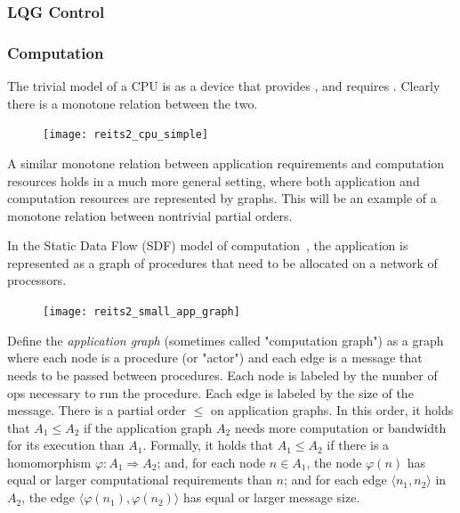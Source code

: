 \begin{figure}[h]
\caption{}
\end{figure}
 

\subsubsection{LQG Control}




\subsubsection{Computation}
 

The trivial model of a CPU is as a device that provides , and requires . Clearly there
is a monotone relation between the two.
\begin{figure}[h]
    \begin{center}
    \texttt{[image: reits2\_cpu\_simple]}
    \caption{}
    \end{center}
    \end{figure}
    
    
A similar monotone relation between application requirements and computation
resources holds in a much more general setting, where both application
and computation resources are represented by graphs. This will be
an example of a monotone relation between nontrivial partial orders.

In the Static Data Flow (SDF) model of computation~\cite[Chapter 3]{sriram00,lee10},
the application is represented as a graph of procedures that need
to be allocated on a network of processors.

\begin{figure}
\texttt{[image: reits2\_small\_app\_graph]}
\end{figure}

Define the\emph{ application graph }(sometimes called "computation
graph") as a graph where each node is a procedure (or "actor")
and each edge is a message that needs to be passed between procedures.
Each node is labeled by the number of ops necessary to run the procedure.
Each edge is labeled by the size of the message. There is a partial
order $ \leq$ on application graphs. In this order, it holds that $A_1 \leq A_2$
if the application graph $A_2$ needs more computation or bandwidth
for its execution than $A_1$. Formally, it holds that $A_1 \leq A_2$
if there is a homomorphism $\varphi:A_1  \Rightarrow A_2$; and,
for each node $n∈A_1$, the node $\varphi(n)$ has equal or
larger computational requirements than $n$; and for each edge $⟨n_1,n_2⟩ $
in $A_2$, the edge $⟨\varphi(n_1),\varphi(n_2)⟩ $
has equal or larger message size.

